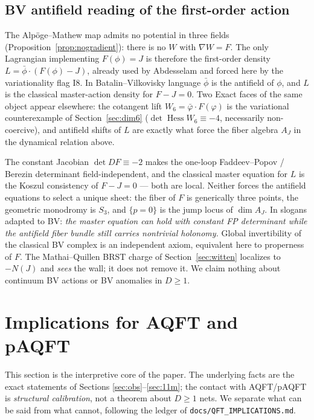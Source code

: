 \documentclass[11pt]{article}
\theoremstyle{definition}
\theoremstyle{remark}
\begin{document}
\subsection{BV antifield reading of the first-order action}
\label{sec:bv-antifield}

The Alp\"oge--Mathew map admits no potential in three fields
(Proposition~\ref{prop:nogradient}): there is no $W$ with
$\nabla W=F$. The only Lagrangian implementing $F(\phi)=J$ is
therefore the first-order density
$L=\bar\phi\cdot(F(\phi)-J)$, already used by Abdesselam
\cite{Abd03} and forced here by the variationality flag I8. In
Batalin--Vilkovisky language $\bar\phi$ is the antifield of $\phi$,
and $L$ is the classical master-action density for $F-J=0$. Two Exact
faces of the same object appear elsewhere: the cotangent lift
$W_6=\bar\varphi\cdot F(\varphi)$ is the variational counterexample of
Section~\ref{sec:dim6} ($\det\operatorname{Hess}W_6\equiv-4$,
necessarily non-coercive), and antifield shifts of $L$ are exactly
what force the fiber algebra $A_J$ in the dynamical relation above.

The constant Jacobian $\det DF\equiv-2$ makes the one-loop
Faddeev--Popov / Berezin determinant field-independent, and the
classical master equation for $L$ is the Koszul consistency of
$F-J=0$ --- both are local. Neither forces the antifield equations to
select a unique sheet: the fiber of $F$ is generically three points,
the geometric monodromy is $S_3$, and $\{p=0\}$ is the jump locus of
$\dim A_J$. In slogans adapted to BV: \emph{the master equation can
hold with constant FP determinant while the antifield fiber bundle
still carries nontrivial holonomy.} Global invertibility of the
classical BV complex is an independent axiom, equivalent here to
properness of $F$. The Mathai--Quillen BRST charge of
Section~\ref{sec:witten} localizes to $-N(J)$ and \emph{sees} the
wall; it does not remove it. We claim nothing about continuum BV
actions or BV anomalies in $D\ge 1$.

\section{Implications for AQFT and pAQFT}\label{sec:qftread}

This section is the interpretive core of the paper. The underlying
facts are the exact statements of Sections
\ref{sec:obs}--\ref{sec:11m}; the contact with AQFT/pAQFT is
\emph{structural calibration}, not a theorem about $D\ge 1$ nets. We
separate what can be said from what cannot, following the ledger of
\texttt{docs/QFT\_IMPLICATIONS.md}.
\end{document}
